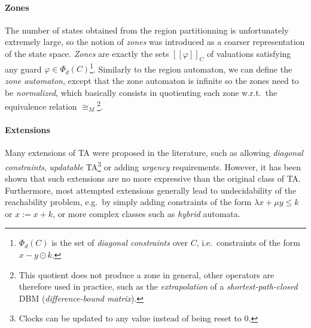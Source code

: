 \documentclass[11pt]{article}
\theoremstyle{definition}
\theoremstyle{remark}
\theoremstyle{definition}
\begin{document}
\paragraph{Zones} \label{par:zones}
The number of states obtained from the region partitionning is unfortunately extremely large, so the notion of \emph{zones} was introduced as a coarser representation of the state space. \emph{Zones} are exactly the sets $[\![\varphi]\!]_C$ of valuations satisfying any guard $\varphi \in \Phi_d(C)$\footnote{$\Phi_d(C)$ is the set of \emph{diagonal constraints} over $C$, i.e.\ constraints of the form $x - y \odot k$.}.
Similarly to the region automaton, we can define the \emph{zone automaton}, except that the zone automaton is infinite so the zones need to be \emph{normalized}, which basically consists in quotienting each zone w.r.t.\ the equivalence relation $\cong_M$\footnote{This quotient does not produce a zone in general, other operators are therefore used in practice, such as the \emph{extrapolation} of a \emph{shortest-path-closed} DBM (\emph{difference-bound matrix}).}.





\paragraph{Extensions}\label{par:ta_ext}
Many extensions of TA were proposed in the literature, such as allowing \emph{diagonal constraints}, \emph{updatable} TA\footnote{Clocks can be updated to any value instead of being reset to 0.} or adding \emph{urgency} requirements. However, it has been shown that such extensions are no more expressive than the original class of TA. Furthermore, most attempted extensions generally lead to undecidability of the reachability problem, e.g.\ by simply adding constraints of the form $\lambda x + \mu y \leq k$ or $x := x + k$, or more complex classes such as \emph{hybrid} automata.
\end{document}
